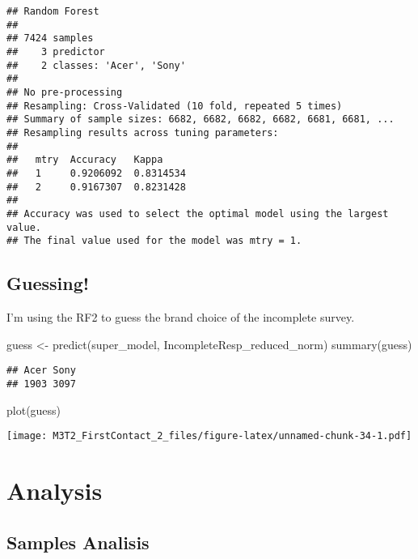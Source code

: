 \documentclass[
]{article}
\newenvironment{Shaded}{\begin{snugshade}}{\end{snugshade}}
\newcommand{\FunctionTok}[1]{\textcolor[rgb]{0.00,0.00,0.00}{#1}}
\newcommand{\NormalTok}[1]{#1}
\newcommand{\OtherTok}[1]{\textcolor[rgb]{0.56,0.35,0.01}{#1}}
\begin{document}
\begin{verbatim}
## Random Forest 
## 
## 7424 samples
##    3 predictor
##    2 classes: 'Acer', 'Sony' 
## 
## No pre-processing
## Resampling: Cross-Validated (10 fold, repeated 5 times) 
## Summary of sample sizes: 6682, 6682, 6682, 6682, 6681, 6681, ... 
## Resampling results across tuning parameters:
## 
##   mtry  Accuracy   Kappa    
##   1     0.9206092  0.8314534
##   2     0.9167307  0.8231428
## 
## Accuracy was used to select the optimal model using the largest value.
## The final value used for the model was mtry = 1.
\end{verbatim}

\hypertarget{guessing}{%
\subsection{Guessing!}\label{guessing}}

I'm using the RF2 to guess the brand choice of the incomplete survey.

\begin{Shaded}
\begin{Highlighting}[]
\NormalTok{guess }\OtherTok{\textless{}{-}} \FunctionTok{predict}\NormalTok{(super\_model, IncompleteResp\_reduced\_norm)}
\FunctionTok{summary}\NormalTok{(guess)}
\end{Highlighting}
\end{Shaded}

\begin{verbatim}
## Acer Sony 
## 1903 3097
\end{verbatim}

\begin{Shaded}
\begin{Highlighting}[]
\FunctionTok{plot}\NormalTok{(guess)}
\end{Highlighting}
\end{Shaded}

\texttt{[image: M3T2\_FirstContact\_2\_files/figure-latex/unnamed-chunk-34-1.pdf]}

\hypertarget{analysis}{%
\section{Analysis}\label{analysis}}

\hypertarget{samples-analisis}{%
\subsection{Samples Analisis}\label{samples-analisis}}
\end{document}
